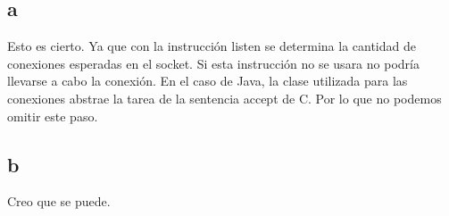 \documentclass{article}
\begin{document}
		\subsection{a}
			Esto es cierto. Ya que con la instrucción listen se determina la cantidad de conexiones esperadas en el socket. Si esta instrucción no se usara no podría llevarse a cabo la conexión.
			En el caso de Java, la clase utilizada para las conexiones abstrae la tarea de la sentencia accept de C. Por lo que no podemos omitir este paso.
		\subsection{b}
		Creo que se puede.
	
	\section{}
			
\end{document}
